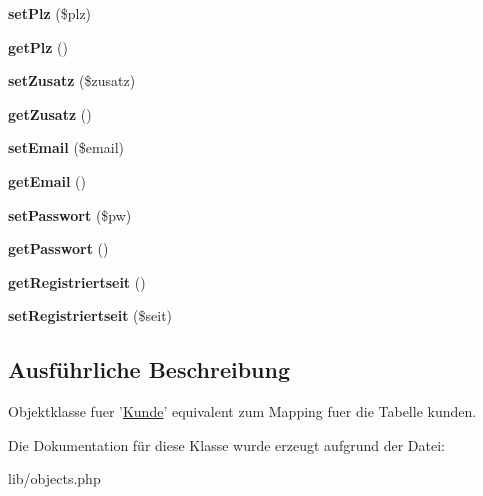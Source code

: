 \begin{DoxyCompactItemize}
\item 
\hypertarget{classKunde_ac77b9f03709bac5d0fdf51af6c5d9506}{{\bfseries set\-Plz} (\$plz)}\label{classKunde_ac77b9f03709bac5d0fdf51af6c5d9506}

\item 
\hypertarget{classKunde_a9fba8370e41ff890f87a95d4d467e684}{{\bfseries get\-Plz} ()}\label{classKunde_a9fba8370e41ff890f87a95d4d467e684}

\item 
\hypertarget{classKunde_a46ef3694829f44f131e5c13b6e82b808}{{\bfseries set\-Zusatz} (\$zusatz)}\label{classKunde_a46ef3694829f44f131e5c13b6e82b808}

\item 
\hypertarget{classKunde_a90e98d3440a64d9883e78dc93a469e66}{{\bfseries get\-Zusatz} ()}\label{classKunde_a90e98d3440a64d9883e78dc93a469e66}

\item 
\hypertarget{classKunde_a750f29ac8456a1de5844423795f2f3bc}{{\bfseries set\-Email} (\$email)}\label{classKunde_a750f29ac8456a1de5844423795f2f3bc}

\item 
\hypertarget{classKunde_af880094791a185aafe1556c1b19c3e0e}{{\bfseries get\-Email} ()}\label{classKunde_af880094791a185aafe1556c1b19c3e0e}

\item 
\hypertarget{classKunde_acf257c68e9212322ba4e66f753c5da24}{{\bfseries set\-Passwort} (\$pw)}\label{classKunde_acf257c68e9212322ba4e66f753c5da24}

\item 
\hypertarget{classKunde_a271f13f3690fb10213d08c5365700ae1}{{\bfseries get\-Passwort} ()}\label{classKunde_a271f13f3690fb10213d08c5365700ae1}

\item 
\hypertarget{classKunde_af99f38bcde53d559fc99c59fbc55eaa1}{{\bfseries get\-Registriertseit} ()}\label{classKunde_af99f38bcde53d559fc99c59fbc55eaa1}

\item 
\hypertarget{classKunde_ab57df5d73763316fc7c9c581e21c9639}{{\bfseries set\-Registriertseit} (\$seit)}\label{classKunde_ab57df5d73763316fc7c9c581e21c9639}

\end{DoxyCompactItemize}


\subsection{\-Ausführliche \-Beschreibung}
\-Objektklasse fuer '\hyperlink{classKunde}{\-Kunde}' equivalent zum \-Mapping fuer die \-Tabelle kunden. 

\-Die \-Dokumentation für diese \-Klasse wurde erzeugt aufgrund der \-Datei\-:\begin{DoxyCompactItemize}
\item 
lib/objects.\-php\end{DoxyCompactItemize}
